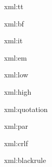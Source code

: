 %
%
%

\startxmlsetups xml:tt
	{\tt {}}
\stopxmlsetups

\startxmlsetups xml:bf
	{\bf {}}
\stopxmlsetups

\startxmlsetups xml:it
	{\it {}}
\stopxmlsetups

\startxmlsetups xml:em
	{\em {}}
\stopxmlsetups

\startxmlsetups xml:low
\stopxmlsetups

\startxmlsetups xml:high
\stopxmlsetups

\startxmlsetups xml:quotation
\stopxmlsetups

\startxmlsetups xml:par
	\par
\stopxmlsetups

\startxmlsetups xml:crlf
	\crlf
\stopxmlsetups

\startxmlsetups xml:blackrule
	\blackrule
\stopxmlsetups

